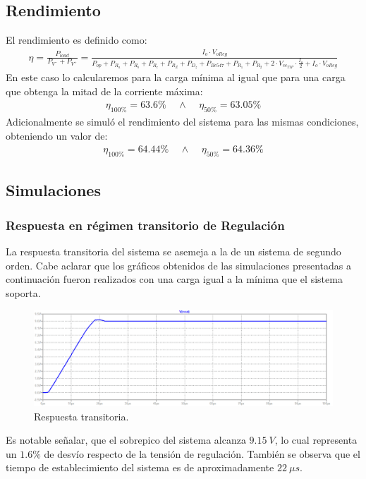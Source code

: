 \subsection{Rendimiento}
El rendimiento es definido como:
\begin{align}
	\eta = \frac{P_{load}}{P_{V^-}+P_{V^+}}=\frac{I_o \cdot V_{oReg}}{P_{op}+P_{R_a}+P_{R_b}+P_{R_c}+P_{R_Z}+P_{D_z}+P_{Bc547}+P_{R_1}+P_{R_2}+2\cdot V_{ce_{TIP}}\cdot \frac{I_o}{2}+I_o \cdot V_{oReg} }
\end{align}
En este caso lo calcularemos para la carga mínima al igual que para una carga que obtenga la mitad de la corriente máxima:
\begin{align}
	\eta_{100\%}  =63.6\%\ \ \ \ \ \wedge  \ \ \ \ \ 
	\eta_{50\%} = 63.05\%
\end{align}
Adicionalmente se simuló el rendimiento del sistema para las mismas condiciones, obteniendo un valor de:
\begin{align}
\eta_{100\%}= 64.44\% \ \ \ \ \ \wedge  \ \ \ \ \ \eta_{50\%}=64.36\%
\end{align}
\subsection{Simulaciones}

\subsubsection{Respuesta en régimen transitorio de Regulación}
La respuesta transitoria del sistema se asemeja a la de un sistema de segundo orden. Cabe aclarar que los gráficos obtenidos de las simulaciones presentadas a continuación fueron realizados con una carga igual a la mínima que el sistema soporta.
\begin{figure}[H]
\centering
	\includegraphics[width=1\textwidth]{ImagenesEjercicio2/transresp.png}
	\caption{Respuesta transitoria.}
	\label{fig:transitorioFuente}
\end{figure}

Es notable señalar, que el sobrepico del sistema alcanza $9.15 \ V$, lo cual representa un $1.6\%$ de desvío respecto de la tensión de regulación. También se observa que el tiempo de establecimiento del sistema es de aproximadamente $22 \ \mu s$.

